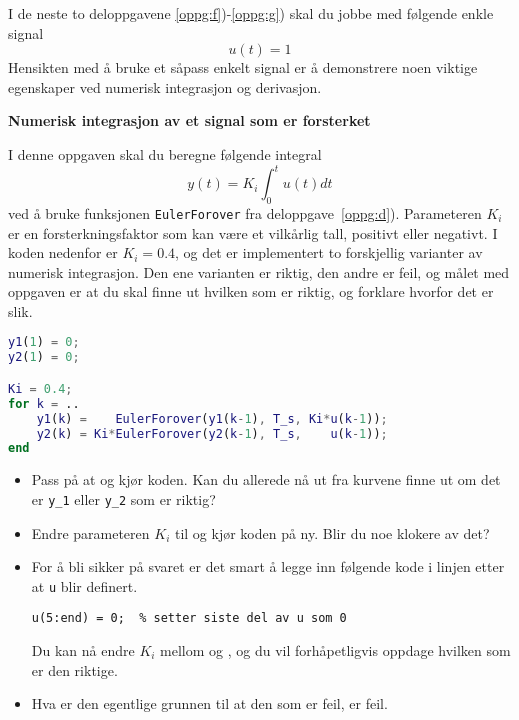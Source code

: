 
\item[] I de neste to deloppgavene \ref{oppg:f})-\ref{oppg:g}) skal du
  jobbe med følgende enkle signal
\begin{equation}
  \label{eq:u2}
 \boxed{ u(t) = 1 }
\end{equation}
Hensikten med å bruke et såpass enkelt signal er å demonstrere 
noen viktige egenskaper ved numerisk integrasjon og derivasjon.


\item
{\bf Numerisk integrasjon av et signal som er forsterket}
\label{oppg:f}

I denne oppgaven skal du beregne følgende integral 
\begin{equation}
  \label{eq:4aa}
  y(t) = K_{i}  \int_{0}^{t}  u(t)dt
\end{equation}
ved å bruke  funksjonen {\tt EulerForover} fra deloppgave~\ref{oppg:d}). 
Parameteren $K_{i}$ er en forsterkningsfaktor som kan være et vilkårlig tall,
positivt eller negativt. 
I koden nedenfor er $K_{i}{=}0.4$, og det er implementert to forskjellig varianter av
numerisk integrasjon. Den ene varianten er riktig, den
andre er feil, og målet med oppgaven er at du skal finne ut hvilken
som er riktig, og forklare hvorfor det er slik.
\vspace*{-5mm}
\begin{lstlisting}[caption={Kode for oppgaven.},
language= Matlab, label=kode:1f, numbers=none] 
% initialverdi
y1(1) = 0;
y2(1) = 0;

Ki = 0.4;
for k = ..
    y1(k) =    EulerForover(y1(k-1), T_s, Ki*u(k-1));
    y2(k) = Ki*EulerForover(y2(k-1), T_s,    u(k-1));
end
\end{lstlisting}
\begin{itemize}
\item Pass på at  og kjør koden. Kan du allerede
  nå ut fra kurvene finne ut om det er {\tt y\_1} eller {\tt y\_2} som er riktig?

\item Endre parameteren $K_{i}$ til  og kjør
  koden på ny. Blir du noe klokere av det? 

\item For å bli sikker på svaret er det smart å legge inn følgende kode
  i linjen etter at {\tt u} blir definert.  

\begin{lstlisting}[numbers=none]
u(5:end) = 0;  % setter siste del av u som 0
\end{lstlisting}

Du kan nå endre $K_{i}$ mellom  og , og du vil forhåpetligvis oppdage hvilken som er den
riktige.

\item Hva er den egentlige grunnen til at den som er feil, er feil.
  
\end{itemize}
